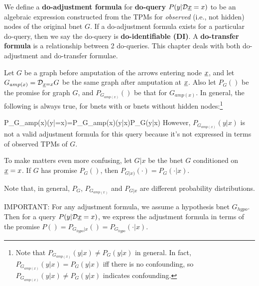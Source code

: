 We define a {\bf do-adjustment formula}
for {\bf do-query}
$P(y|\cald\rvx=x)$
to be an algebraic expression  
constructed from the TPMs for {\it observed} (i.e., not hidden) nodes of the original bnet $G$.
If a do-adjustment formula
exists for a
particular do-query,
then we say the do-query is
 {\bf do-identifiable (DI)}.
A {\bf do-transfer formula}
is a relationship between 2  do-queries.
This chapter deals with both
do-adjustment and do-transfer
formulae.

Let $G$ be a graph before
amputation
of the arrows entering node $\rvx$,
and let $G_{amp(x)}=\cald_{\rvx=x}G$
be the same graph after amputation
at $\rvx$.
Also let $P_G()$ be
the promise
for graph $G$, and $P_{G_{amp(x)}}()$
be that for $G_{amp(x)}$.
In general, the
following is always true,
for bnets
with or bnets without hidden nodes:\footnote{Note that $P_{G_{amp(x)}}(y|x)\neq P_G(y|x)$
in general.
In fact,
$P_{G_{amp(x)}}(y|x)= P_G(y|x)$
iff there is no confounding,
so $P_{G_{amp(x)}}(y|x)\neq P_G(y|x)$
indicates confounding.
}

\beq
P_{G_{amp(x)}}(y|\cald\rvx=x)=P_{G_{amp(x)}}(y|x)\neq P_G(y|x)
\;
\eeq
However, $P_{G_{amp(x)}}(y|x)$ is
not a valid adjustment formula
for this query
because it's not expressed in terms
of observed TPMs of $G$.

To make matters even more confusing, let $G|x$
be the bnet $G$ conditioned on $\rvx=x$. If $G$ has promise $P_G()$,
then  $P_{G|x)}(\cdot) = P_G(\cdot|x)$.
 
Note that, in general,  $P_G$, $P_{G_{amp(x)}}$ and $P_{G|x}$ are
different probability distributions. 

IMPORTANT: For any adjustment formula, we assume
a hypothesis bnet $G_{hypo}$.
Then for a query
$P(y|\cald\rvx=x)$, we express the adjustment
formula in terms of the promise $P()=P_{G_{hypo}|x}()=P_{G_{hypo}}(\cdot|x)$.




